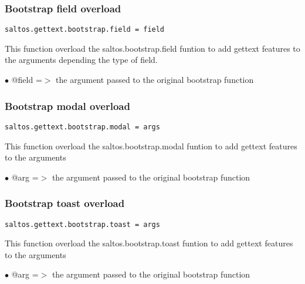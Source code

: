 \documentclass[a4paper]{article}
\begin{document}
\hypertarget{toc802}{}
\subsubsection{Bootstrap field overload}

\begin{lstlisting}
saltos.gettext.bootstrap.field = field
\end{lstlisting}

This function overload the saltos.bootstrap.field funtion to add gettext
features to the arguments depending the type of field.

\begin{compactitem}
\item[\color{myblue}$\bullet$] @field =$>$ the argument passed to the original bootstrap function
\end{compactitem}

\hypertarget{toc803}{}
\subsubsection{Bootstrap modal overload}

\begin{lstlisting}
saltos.gettext.bootstrap.modal = args
\end{lstlisting}

This function overload the saltos.bootstrap.modal funtion to add gettext
features to the arguments

\begin{compactitem}
\item[\color{myblue}$\bullet$] @arg =$>$ the argument passed to the original bootstrap function
\end{compactitem}

\hypertarget{toc804}{}
\subsubsection{Bootstrap toast overload}

\begin{lstlisting}
saltos.gettext.bootstrap.toast = args
\end{lstlisting}

This function overload the saltos.bootstrap.toast funtion to add gettext
features to the arguments

\begin{compactitem}
\item[\color{myblue}$\bullet$] @arg =$>$ the argument passed to the original bootstrap function
\end{compactitem}
\end{document}
